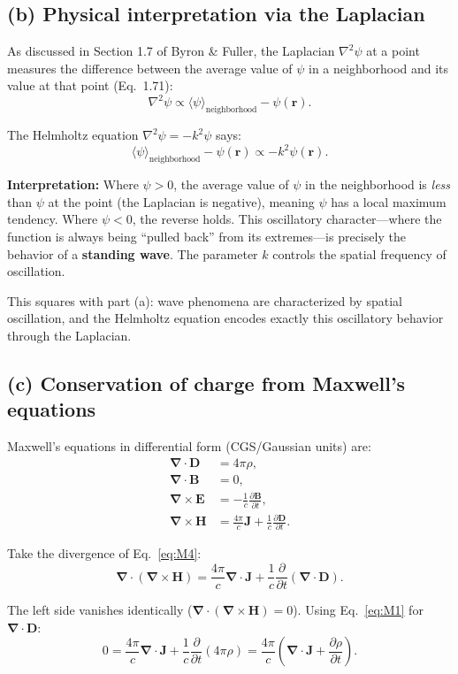 \documentclass[12pt]{article}
\newcommand{\vect}[1]{\mathbf{#1}}
\newcommand{\grad}{\boldsymbol{\nabla}}
\newcommand{\curl}{\grad\times}
\newcommand{\divr}{\grad\cdot}
\begin{document}
\subsection*{(b) Physical interpretation via the Laplacian}

As discussed in Section 1.7 of Byron \& Fuller, the Laplacian $\nabla^2\psi$ at a point measures the difference between the average value of $\psi$ in a neighborhood and its value at that point (Eq.~1.71):
\[
\nabla^2\psi \propto \langle\psi\rangle_{\text{neighborhood}} - \psi(\vect{r}).
\]

The Helmholtz equation $\nabla^2\psi = -k^2\psi$ says:
\[
\langle\psi\rangle_{\text{neighborhood}} - \psi(\vect{r}) \propto -k^2\psi(\vect{r}).
\]

\textbf{Interpretation:} Where $\psi > 0$, the average value of $\psi$ in the neighborhood is \emph{less} than $\psi$ at the point (the Laplacian is negative), meaning $\psi$ has a local maximum tendency. Where $\psi < 0$, the reverse holds. This oscillatory character---where the function is always being ``pulled back'' from its extremes---is precisely the behavior of a \textbf{standing wave}. The parameter $k$ controls the spatial frequency of oscillation.

This squares with part (a): wave phenomena are characterized by spatial oscillation, and the Helmholtz equation encodes exactly this oscillatory behavior through the Laplacian.

\subsection*{(c) Conservation of charge from Maxwell's equations}

Maxwell's equations in differential form (CGS/Gaussian units) are:
\begin{align}
\divr\vect{D} &= 4\pi\rho, \label{eq:M1} \\
\divr\vect{B} &= 0, \label{eq:M2} \\
\curl\vect{E} &= -\frac{1}{c}\frac{\partial\vect{B}}{\partial t}, \label{eq:M3} \\
\curl\vect{H} &= \frac{4\pi}{c}\vect{J} + \frac{1}{c}\frac{\partial\vect{D}}{\partial t}. \label{eq:M4}
\end{align}

Take the divergence of Eq.~\eqref{eq:M4}:
\[
\divr(\curl\vect{H}) = \frac{4\pi}{c}\divr\vect{J} + \frac{1}{c}\frac{\partial}{\partial t}(\divr\vect{D}).
\]

The left side vanishes identically ($\divr(\curl\vect{H}) = 0$). Using Eq.~\eqref{eq:M1} for $\divr\vect{D}$:
\[
0 = \frac{4\pi}{c}\divr\vect{J} + \frac{1}{c}\frac{\partial}{\partial t}(4\pi\rho) = \frac{4\pi}{c}\left(\divr\vect{J} + \frac{\partial\rho}{\partial t}\right).
\]
\end{document}
